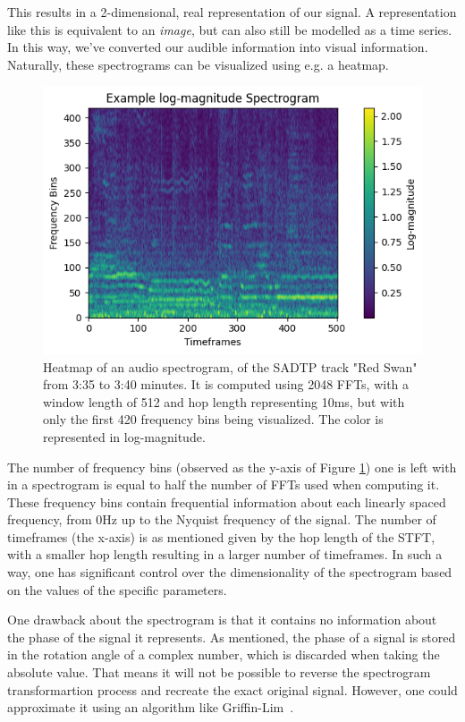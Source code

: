 This results in a 2-dimensional, real representation of our signal. A representation like this is equivalent to an \textit{image}, but can also still be modelled as a time series. In this way, we've converted our audible information into visual information. Naturally, these spectrograms can be visualized using e.g. a heatmap.

\begin{figure}[H]
    \centering
    \includegraphics[scale=1.1]{figures/logspectrogram}
    \caption{Heatmap of an audio spectrogram, of the SADTP track "Red Swan" from 3:35 to 3:40 minutes. It is computed using 2048 \glspl{FFT}, with a window length of 512 and hop length representing 10ms, but with only the first 420 frequency bins being visualized. The color is represented in log-magnitude.}
    \label{SpectrogramFigure}
\end{figure}

The number of frequency bins (observed as the y-axis of Figure \ref{SpectrogramFigure}) one is left with in a spectrogram is equal to half the number of \glspl{FFT} used when computing it. These frequency bins contain frequential information about each linearly spaced frequency, from 0Hz up to the Nyquist frequency of the signal. The number of timeframes (the x-axis) is as mentioned given by the hop length of the \gls{STFT}, with a smaller hop length resulting in a larger number of timeframes. In such a way, one has significant control over the dimensionality of the spectrogram based on the values of the specific parameters. 

One drawback about the spectrogram is that it contains no information about the phase of the signal it represents. As mentioned, the phase of a signal is stored in the rotation angle of a complex number, which is discarded when taking the absolute value. That means it will not be possible to reverse the spectrogram transformartion process and recreate the exact original signal. However, one could approximate it using an algorithm like Griffin-Lim~\cite{1164317}.

